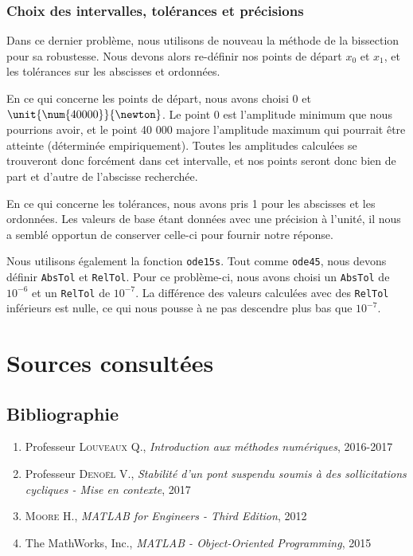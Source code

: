 \documentclass[a4paper, 12pt]{article}
\begin{document}
	\subsubsection{Choix des intervalles, tolérances et précisions}
	Dans ce dernier problème, nous utilisons de nouveau la méthode de la bissection pour sa robustesse. Nous devons alors re-définir nos points de départ $x_{0}$ et $x_{1}$, et les tolérances sur les abscisses et ordonnées.\par
	En ce qui concerne les points de départ, nous avons choisi $\unit{\num{0}}{}$ et $\unit{\num{40000}}{\newton}$. Le point 0 est l'amplitude minimum que nous pourrions avoir, et le point 40 000 majore l'amplitude maximum qui pourrait être atteinte (déterminée empiriquement). Toutes les amplitudes calculées se trouveront donc forcément dans cet intervalle, et nos points seront donc bien de part et d'autre de l'abscisse recherchée.\par
	En ce qui concerne les tolérances, nous avons pris 1 pour les abscisses et les ordonnées. Les valeurs de base étant données avec une précision à l'unité, il nous a semblé opportun de conserver celle-ci pour fournir notre réponse.\par
	Nous utilisons également la fonction \texttt{ode15s}. Tout comme \texttt{ode45}, nous devons définir \texttt{AbsTol} et \texttt{RelTol}. Pour ce problème-ci, nous avons choisi un \texttt{AbsTol} de $10^{-6}$ et un \texttt{RelTol} de $10^{-7}$. La différence des valeurs calculées avec des \texttt{RelTol} inférieurs est nulle, ce qui nous pousse à ne pas descendre plus bas que $10^{-7}$.
	\section{Sources consultées}
	\subsection{Bibliographie}
	\begin{enumerate}
		\item Professeur \textsc{Louveaux} Q., \textit{Introduction aux méthodes numériques}, 2016-2017
		\item Professeur \textsc{Denoël} V., \textit{Stabilité d’un pont suspendu soumis à des sollicitations cycliques - Mise en contexte}, 2017
		\item \textsc{Moore} H., \textit{MATLAB for Engineers - Third Edition}, 2012
		\item The MathWorks, Inc., \textit{MATLAB - Object-Oriented Programming}, 2015
	\end{enumerate}
\end{document}
